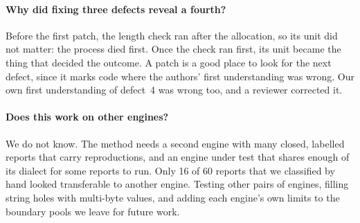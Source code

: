 \paragraph{Why did fixing three defects reveal a fourth?} Before the first patch,
the length check ran after the allocation, so its unit did not matter: the
process died first. Once the check ran first, its unit became the thing that
decided the outcome. A
patch is a good place to look for the next defect, since it marks code where the
authors' first understanding was wrong. Our own first understanding of defect~4
was wrong too, and a reviewer corrected it.

\paragraph{Does this work on other engines?} We do not know. The method needs a
second engine with many closed, labelled reports that carry reproductions, and
an engine under test that shares enough of its dialect for some reports to run.
Only 16 of 60 reports that we classified by hand looked transferable to another
engine. Testing other pairs of engines, filling string holes with multi-byte
values, and adding each engine's own limits to the boundary pools we leave for
future work.
